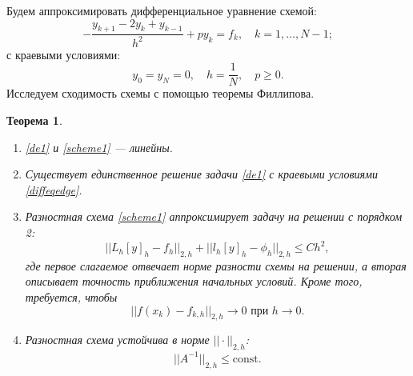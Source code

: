 \documentclass[14pt,a4paper]{extarticle}
\newtheorem{theorem}{Теорема} %
\newcommand{\1}{\mathbbm{1}}
\begin{document}
Будем аппроксимировать дифференциальное уравнение схемой:
\begin{equation} \label{scheme1}
    -\frac{y_{k+1} - 2 y_k + y_{k-1}}{h^2} + p y_k = f_k, \quad k = 1, \ldots, N - 1;
\end{equation}
с краевыми условиями:
\begin{equation} \label{schemeedge}
    y_0 = y_N = 0,
    \quad h = \frac{1}{N}, 
    \quad p \geq 0.
\end{equation}
Исследуем сходимость схемы с помощью теоремы Филлипова.
\begin{theorem}
    \begin{enumerate}
        \item \eqref{de1} и \eqref{scheme1} --- линейны.
        \item Существует единственное решение задачи \eqref{de1} с краевыми условиями \eqref{diffeqedge}.
        \item Разностная схема \eqref{scheme1} аппроксимирует задачу на решении с порядком 2:
            \begin{equation*}
                || L_h [y]_h - f_h || _{2, h} + || l_h [y]_h - \phi_h || _{2, h} \leq C h^2,           
            \end{equation*}
            где первое слагаемое отвечает норме разности схемы на решении, а вторая описывает точность 
            приближения начальных условий. Кроме того, требуется, чтобы
            \begin{equation*}
                || f(x_k) - f_{k, h}|| _{2, h} \rightarrow 0 \text{ при } h \rightarrow 0.           
            \end{equation*}
        \item Разностная схема устойчива в норме $||\cdot||_{2,h}$:
        \begin{equation*}
            || A^{-1} ||_{2,h} \leq \text{const}.
        \end{equation*}
    \end{enumerate}
\end{theorem}
\end{document}
